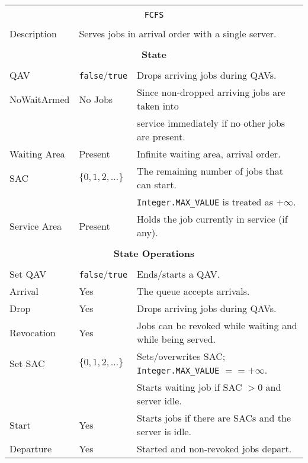 \documentclass[12pt]{book}
\begin{document}
\begin{tabular}{|l|l|l|}
\hline
\multicolumn{3}{|c|}{} \\
\multicolumn{3}{|c|}{\lstinline[basicstyle=\large]{FCFS}} \\
\multicolumn{3}{|c|}{} \\
\hline
Description & \multicolumn{2}{|l|}{Serves jobs in arrival order with a single server.} \\
\hline
\multicolumn{3}{|c|}{} \\
\multicolumn{3}{|c|}{\bf State} \\
\multicolumn{3}{|c|}{} \\
\hline
QAV & \lstinline|false|/\lstinline|true| & Drops arriving jobs during QAVs. \\
\hline
NoWaitArmed & No Jobs & Since non-dropped arriving jobs are taken into \\
            &         & service immediately if no other jobs are present. \\
\hline
Waiting Area & Present & Infinite waiting area, arrival order. \\
\hline
SAC & $\{0, 1, 2, \ldots\}$ & The remaining number of jobs that can start. \\
    &                       & \lstinline|Integer.MAX_VALUE| is treated as $+\infty$. \\
\hline
Service Area & Present & Holds the job currently in service (if any). \\
\hline
\multicolumn{3}{|c|}{} \\
\multicolumn{3}{|c|}{\bf State Operations} \\
\multicolumn{3}{|c|}{} \\
\hline
Set QAV & \lstinline|false|/\lstinline|true| & Ends/starts a QAV. \\
\hline
Arrival & Yes & The queue accepts arrivals. \\
\hline
Drop & Yes & Drops arriving jobs during QAVs. \\
\hline
Revocation & Yes & Jobs can be revoked while waiting and while being served. \\
\hline
Set SAC & $\{0, 1, 2, \ldots\}$ & Sets/overwrites SAC; \lstinline|Integer.MAX_VALUE| $== +\infty$. \\
        &                       & Starts waiting job if SAC $> 0$ and server idle. \\
\hline
Start & Yes & Starts jobs if there are SACs and the server is idle. \\
\hline
Departure & Yes & Started and non-revoked jobs depart. \\

\end{tabular}
\end{document}
